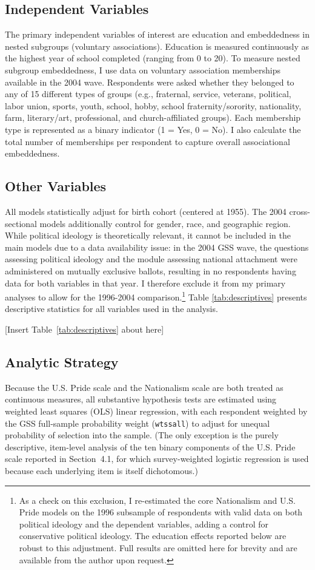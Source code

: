 \documentclass[12pt,letterpaper]{article}
\begin{document}
\subsection{Independent Variables}
The primary independent variables of interest are education and embeddedness in nested subgroups (voluntary associations). Education is measured continuously as the highest year of school completed (ranging from 0 to 20). To measure nested subgroup embeddedness, I use data on voluntary association memberships available in the 2004 wave. Respondents were asked whether they belonged to any of 15 different types of groups (e.g., fraternal, service, veterans, political, labor union, sports, youth, school, hobby, school fraternity/sorority, nationality, farm, literary/art, professional, and church-affiliated groups). Each membership type is represented as a binary indicator (1 = Yes, 0 = No). I also calculate the total number of memberships per respondent to capture overall associational embeddedness. 

\subsection{Other Variables}
All models statistically adjust for birth cohort (centered at 1955). The 2004 cross-sectional models additionally control for gender, race, and geographic region. While political ideology is theoretically relevant, it cannot be included in the main models due to a data availability issue: in the 2004 GSS wave, the questions assessing political ideology and the module assessing national attachment were administered on mutually exclusive ballots, resulting in no respondents having data for both variables in that year. I therefore exclude it from my primary analyses to allow for the 1996-2004 comparison.\footnote{As a check on this exclusion, I re-estimated the core Nationalism and U.S. Pride models on the 1996 subsample of respondents with valid data on both political ideology and the dependent variables, adding a control for conservative political ideology. The education effects reported below are robust to this adjustment. Full results are omitted here for brevity and are available from the author upon request.} Table \ref{tab:descriptives} presents descriptive statistics for all variables used in the analysis.

[Insert Table~\ref{tab:descriptives} about here]


\subsection{Analytic Strategy}
Because the U.S. Pride scale and the Nationalism scale are both treated as continuous measures, all substantive hypothesis tests are estimated using weighted least squares (OLS) linear regression, with each respondent weighted by the GSS full-sample probability weight (\texttt{wtssall}) to adjust for unequal probability of selection into the sample. (The only exception is the purely descriptive, item-level analysis of the ten binary components of the U.S. Pride scale reported in Section~4.1, for which survey-weighted logistic regression is used because each underlying item is itself dichotomous.)
\end{document}
